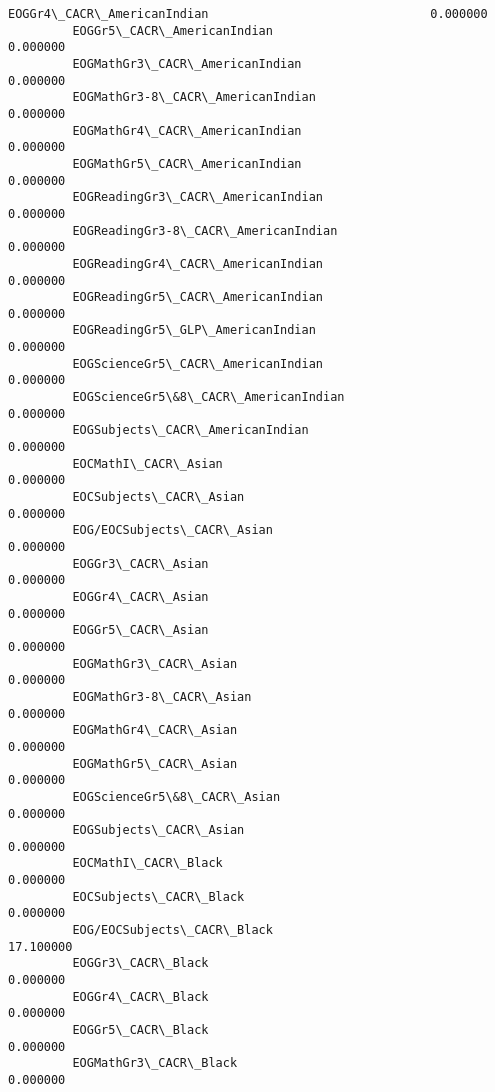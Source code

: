 \documentclass[11pt]{article}
\begin{document}
\begin{Verbatim}[commandchars=\\\{\}]
         EOGGr4\_CACR\_AmericanIndian                               0.000000   
         EOGGr5\_CACR\_AmericanIndian                               0.000000   
         EOGMathGr3\_CACR\_AmericanIndian                           0.000000   
         EOGMathGr3-8\_CACR\_AmericanIndian                         0.000000   
         EOGMathGr4\_CACR\_AmericanIndian                           0.000000   
         EOGMathGr5\_CACR\_AmericanIndian                           0.000000   
         EOGReadingGr3\_CACR\_AmericanIndian                        0.000000   
         EOGReadingGr3-8\_CACR\_AmericanIndian                      0.000000   
         EOGReadingGr4\_CACR\_AmericanIndian                        0.000000   
         EOGReadingGr5\_CACR\_AmericanIndian                        0.000000   
         EOGReadingGr5\_GLP\_AmericanIndian                         0.000000   
         EOGScienceGr5\_CACR\_AmericanIndian                        0.000000   
         EOGScienceGr5\&8\_CACR\_AmericanIndian                      0.000000   
         EOGSubjects\_CACR\_AmericanIndian                          0.000000   
         EOCMathI\_CACR\_Asian                                      0.000000   
         EOCSubjects\_CACR\_Asian                                   0.000000   
         EOG/EOCSubjects\_CACR\_Asian                               0.000000   
         EOGGr3\_CACR\_Asian                                        0.000000   
         EOGGr4\_CACR\_Asian                                        0.000000   
         EOGGr5\_CACR\_Asian                                        0.000000   
         EOGMathGr3\_CACR\_Asian                                    0.000000   
         EOGMathGr3-8\_CACR\_Asian                                  0.000000   
         EOGMathGr4\_CACR\_Asian                                    0.000000   
         EOGMathGr5\_CACR\_Asian                                    0.000000   
         EOGScienceGr5\&8\_CACR\_Asian                               0.000000   
         EOGSubjects\_CACR\_Asian                                   0.000000   
         EOCMathI\_CACR\_Black                                      0.000000   
         EOCSubjects\_CACR\_Black                                   0.000000   
         EOG/EOCSubjects\_CACR\_Black                              17.100000   
         EOGGr3\_CACR\_Black                                        0.000000   
         EOGGr4\_CACR\_Black                                        0.000000   
         EOGGr5\_CACR\_Black                                        0.000000   
         EOGMathGr3\_CACR\_Black                                    0.000000   

\end{Verbatim}
\end{document}
